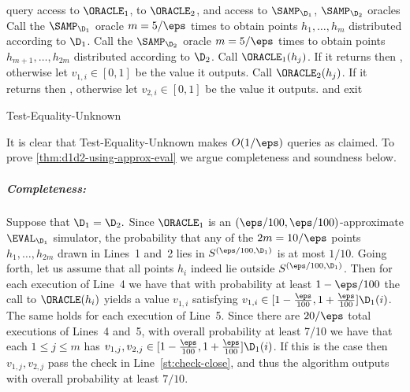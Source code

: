 \begin{algorithm}\begin{algorithmic}[1]
\Require query access to $\ORACLE_1$, to $\ORACLE_2$, and access to
$\SAMP_{\D_1}$, $\SAMP_{\D_2}$ oracles
\State \label{st:init-sample1}
Call the $\SAMP_{\D_1}$ oracle $m = 5/\eps$
times to obtain points $h_1,\dots,h_{m}$ distributed according
to ${\D_1}$.
\State \label{st:init-sample2}
Call the $\SAMP_{\D_2}$ oracle $m = 5/\eps$
times to obtain points $h_{m+1},\dots,h_{2m}$ distributed according
to ${\D_2}$.
    \State \label{st:call-eval-d1}  Call $\ORACLE_1(h_j)$.  If it
returns \unknown then \Return \reject, otherwise let $v_{1,i} \in [0,1]$
be the value it outputs.
    \State \label{st:call-eval-d2}  Call $\ORACLE_2(h_j)$.  If it
returns \unknown then \Return \reject, otherwise let $v_{2,i} \in [0,1]$
be the value it outputs.
\label{st:check-close}
\State \label{st:reject-because-far} {\Return \reject and exit}
\EndIf\EndFor
\State \Return \accept
\end{algorithmic}\caption{\label{algo:test-equality-unknown}\sc Test-Equality-Unknown}
\end{algorithm}

It is clear that {\sc Test-Equality-Unknown} makes $O(1/\eps)$ queries
as claimed.  To prove
\cref{thm:d1d2-using-approx-eval} we argue completeness and
soundness below.

\medskip

\subparagraph{Completeness:}
Suppose that $\D_1 = \D_2.$  Since $\ORACLE_1$ is an $(\eps/100,
\eps/100)$-approximate $\EVAL_{\D_1}$ simulator, the probability
that any of the $2m=10/\eps$ points $h_1,\dots,h_{2m}$ drawn
in Lines~1 and~2 lies in $S^{(\eps/100,\D_1)}$ is at most $1/10.$
Going forth, let us assume that all points $h_i$ indeed
lie outside $S^{(\eps/100,\D_1)}$.
Then for each execution of Line~4 we have that with probability
at least $1-\eps/100$ the call to $\ORACLE(h_i)$ yields a value
$v_{1,i}$ satisfying $v_{1,i} \in [1-{\frac{\eps}{100}},
1+{\frac{\eps}{100}}] \D_1(i)$.  The same holds for each execution of
Line~5.  Since there are $20/\eps$ total executions of
Lines~4 and~5, with overall probability at least 7/10 we have that
each $1 \leq j \leq m$ has
$v_{1,j},v_{2,j} \in [1-{\frac{\eps}{100}}, 1+{\frac{\eps}{100}}] \D_1(i)$.
If this is the case then $v_{1,j},v_{2,j}$ pass the check in
Line~\ref{st:check-close},
and thus the algorithm outputs \accept with overall probability at least
$7/10.$

